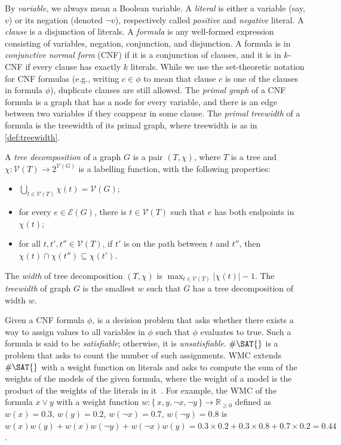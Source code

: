\documentclass[runningheads]{llncs}
\begin{document}
By \emph{variable}, we always mean a Boolean variable. A \emph{literal} is
either a variable (say, $v$) or its negation (denoted $\neg v$), respectively
called \emph{positive} and \emph{negative} literal. A \emph{clause} is a
disjunction of literals. A \emph{formula} is any well-formed expression
consisting of variables, negation, conjunction, and disjunction. A formula is in
\emph{conjunctive normal form} (CNF) if it is a conjunction of clauses, and it
is in $k$-CNF if every clause has exactly $k$ literals. While we use the
set-theoretic notation for CNF formulas (e.g., writing $c \in \phi$ to mean that
clause $c$ is one of the clauses in formula $\phi$), duplicate clauses are still
allowed. The \emph{primal graph} of a CNF formula is a graph that has a node for
every variable, and there is an edge between two variables if they coappear in
some clause. The \emph{primal treewidth} of a formula is the treewidth of its
primal graph, where treewidth is as in \cref{def:treewidth}.

\begin{definition}\label{def:treewidth}
  A \emph{tree decomposition} of a graph $G$ is a pair $(T, \chi)$, where $T$ is
  a tree and $\chi\colon \mathcal{V}(T) \to 2^{\mathcal{V}(G)}$ is a labelling
  function, with the following properties:
  \begin{itemize}
    \item $\bigcup_{t \in \mathcal{V}(T)} \chi(t) = \mathcal{V}(G)$;
    \item for every $e \in \mathcal{E}(G)$, there is $t \in \mathcal{V}(T)$ such
          that $e$ has both endpoints in $\chi(t)$;
    \item for all $t, t', t'' \in \mathcal{V}(T)$, if $t'$ is on the path
          between $t$ and $t''$, then
          $\chi(t) \cap \chi(t'') \subseteq \chi(t')$.
  \end{itemize}
  The \emph{width} of tree decomposition $(T, \chi)$ is
  $\max_{t \in \mathcal{V}(T)} |\chi(t)| - 1$. The \emph{treewidth} of graph $G$
  is the smallest $w$ such that $G$ has a tree decomposition of width $w$.
\end{definition}

Given a CNF formula $\phi$, \SAT{} is a decision problem that asks whether there
exists a way to assign values to all variables in $\phi$ such that $\phi$
evaluates to true. Such a formula is said to be \emph{satisfiable}; otherwise,
it is \emph{unsatisfiable}. $\#\SAT{}$ is a problem that asks to count the
number of such assignments. \textsf{WMC} extends $\#\SAT{}$ with a weight
function on literals and asks to compute the sum of the weights of the models of
the given formula, where the weight of a model is the product of the weights of
the literals in it~\cite{DBLP:journals/ai/ChaviraD08}. For example, the
\textsf{WMC} of the formula $x \lor y$ with a weight function $w\colon \{\,x, y,
\neg x, \neg y\,\} \to \mathbb{R}_{\ge 0}$ defined as $w(x) = 0.3$, $w(y) = 0.2$,
$w(\neg x) = 0.7$, $w(\neg y) = 0.8$ is $w(x)w(y)+w(x)w(\neg y)+w(\neg x)w(y) =
0.3 \times 0.2 + 0.3 \times 0.8 + 0.7 \times 0.2 = 0.44$.
\end{document}

